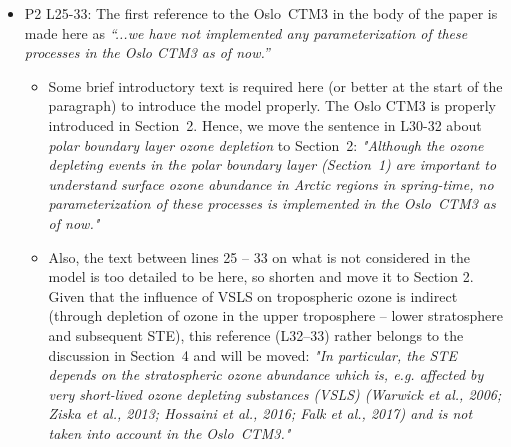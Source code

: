 \documentclass{scrartcl}
\begin{document}
\begin{itemize}
\item {\color{blue}  P2 L25-33: The first reference to the Oslo~CTM3 in the body of the paper is
  made here as \emph{“...we have not implemented any parameterization of these processes
    in the Oslo CTM3 as of now.”} }
  \begin{itemize}
  \item {\color{blue} Some brief introductory text is required here (or better at
    the start of the paragraph) to introduce the model properly.}
    The Oslo CTM3 is properly introduced in Section~2. Hence, we move the sentence in L30-32 about \emph{polar boundary layer ozone depletion} to Section~2:
    \emph{"Although the ozone depleting events in the polar boundary layer (Section~1) are important to understand surface ozone abundance in Arctic regions in spring-time, no parameterization of these processes is implemented in the Oslo~CTM3 as of now."}
  \item {\color{blue} Also, the text between lines
    25 -- 33 on what is not considered in the model is too detailed to be here, so shorten
    and move it to Section 2.}
    Given that the influence of VSLS on tropospheric ozone is indirect (through depletion of ozone in the upper troposphere -- lower stratosphere and subsequent STE), this reference (L32--33) rather belongs to the discussion in Section~4 and will be moved:
    \emph{"In particular, the STE depends on the stratospheric ozone abundance which is, e.g. affected by very short-lived ozone depleting substances (VSLS) (Warwick et al., 2006; Ziska et al., 2013; Hossaini et al., 2016; Falk et al., 2017) and is not taken into account in the Oslo~CTM3."}
  \end{itemize}


\end{itemize}
\end{document}
